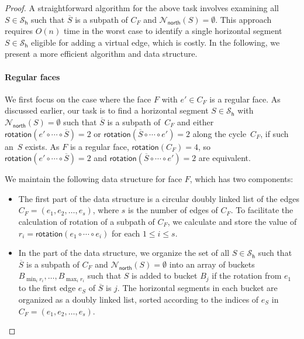 \documentclass{theoretics}
\newcommand{\PH}{\mathcal{S}_\mathsf{h}}
\newcommand{\Nnorth}{\mathcal{N}_\mathsf{north}}
\newcommand{\rotation}{\mathsf{rotation}}
\begin{document}
\begin{proof}
 A straightforward algorithm for the above task involves examining all $S \in \PH$ such that $\overline{S}$ is a subpath of $C_F$ and $\Nnorth(S) = \emptyset$. This approach requires 
$O(n)$ time in the worst case to identify a single horizontal segment $S \in \PH$ eligible for adding a virtual edge, which is costly. In the following, we present a more efficient algorithm and data structure.  
 
  \paragraph{Regular faces}
 We first focus on the case where the face $F$ with $e' \in C_F$ is a regular face. As discussed earlier, our task is to find a horizontal segment $S \in \PH$ with $\Nnorth(S) = \emptyset$ such that $\overline{S}$ is a subpath of~$C_F$ and either $\rotation(e' \circ \cdots \circ \overline{S}) = 2$ or  $\rotation(\overline{S} \circ \cdots \circ e') = 2$ along the cycle~$C_F$, if such an~$S$ exists. As $F$  is a regular face, $\rotation(C_F)=4$, so $\rotation(e' \circ \cdots \circ \overline{S}) = 2$ and  $\rotation(\overline{S} \circ \cdots \circ e') = 2$ are equivalent. 

We maintain the following data structure for face $F$, which has two components:
\begin{itemize}
    \item The first part of the data structure is a circular doubly linked list of the edges $C_F=(e_1, e_2, \ldots, e_s)$, where $s$ is the number of edges of $C_F$. To facilitate the calculation of rotation of a subpath of $C_F$, we calculate and store the value of $r_i = \rotation(e_1 \circ \cdots \circ e_i)$ for each $1 \leq i \leq s$.
    \item In the part of the data structure, we organize the set of all $S \in \PH$ such that $\overline{S}$ is a subpath of $C_F$ and $\Nnorth(S) = \emptyset$ into an array of buckets $B_{\min_i r_i}, \ldots, B_{\max_i r_i}$ such that $S$ is added to bucket $B_j$ if the rotation from $e_1$ to the first edge $e_S$ of $\overline{S}$ is $j$. The horizontal segments in each bucket are organized as a doubly linked list, sorted according to the indices of $e_S$ in $C_F=(e_1, e_2, \ldots, e_s)$. 
\end{itemize}
 
 
 

\end{proof}
\end{document}
